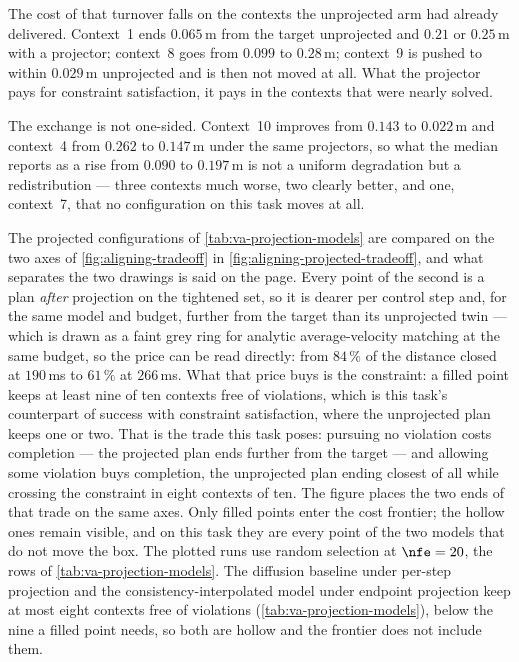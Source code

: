The cost of that turnover falls on the contexts the unprojected arm had already delivered. Context~1 ends
$0.065$\,m from the target unprojected and $0.21$ or $0.25$\,m with a projector; context~8 goes from
$0.099$ to $0.28$\,m; context~9 is pushed to within $0.029$\,m unprojected and is then not moved at all.
What the projector pays for constraint satisfaction, it pays in the contexts that were nearly solved.

The exchange is not one-sided. Context~10 improves from $0.143$ to $0.022$\,m and context~4 from
$0.262$ to $0.147$\,m under the same projectors, so what the median reports as a rise from $0.090$ to
$0.197$\,m is not a uniform degradation but a redistribution --- three contexts much worse, two clearly
better, and one, context~7, that no configuration on this task moves at all.

The projected configurations of \autoref{tab:va-projection-models} are compared on the two axes of
\autoref{fig:aligning-tradeoff} in \autoref{fig:aligning-projected-tradeoff}, and what separates the two
drawings is said on the page. Every point of the second is a plan \emph{after} projection on the tightened
set, so it is dearer per control step and, for the same model and budget, further from the target than its
unprojected twin --- which is drawn as a faint grey ring for analytic average-velocity matching at the same
budget, so the price can be read directly: from $84\,\%$ of the distance closed at $190$\,ms to
$61\,\%$ at $266$\,ms. What that price buys is the constraint: a filled point keeps at least nine of ten
contexts free of violations, which is this task's counterpart of success with constraint satisfaction,
where the unprojected plan keeps one or two. That is the trade this task poses: pursuing no violation
costs completion --- the projected plan ends further from the target --- and allowing some violation
buys completion, the unprojected plan ending closest of all while crossing the constraint in eight
contexts of ten. The figure places the two ends of that trade on the same axes. Only filled points enter the cost frontier; the hollow ones
remain visible, and on this task they are every point of the two models that do not move the box. The
plotted runs use random selection at $\nfe=20$, the rows of \autoref{tab:va-projection-models}. The
diffusion baseline under per-step projection and the consistency-interpolated model under endpoint
projection keep at most eight contexts free of violations (\autoref{tab:va-projection-models}), below the
nine a filled point needs, so both are hollow and the frontier does not include them.

